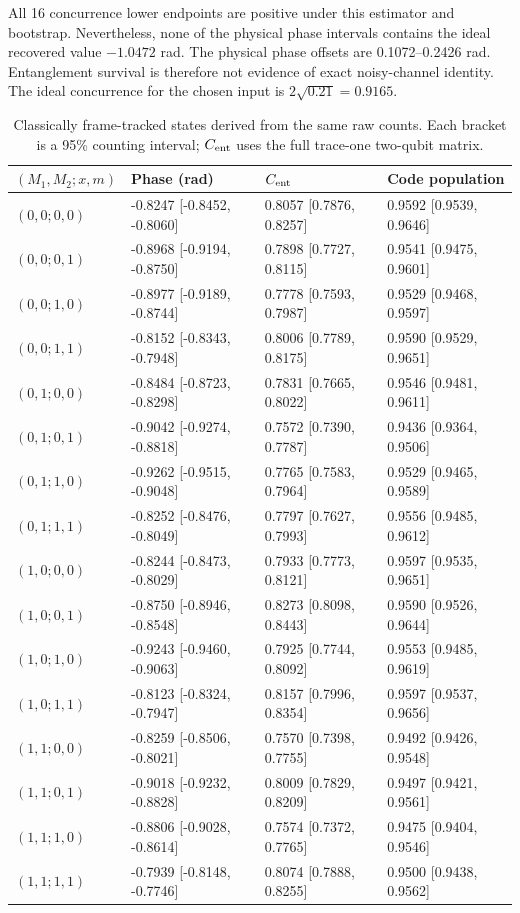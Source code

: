 \documentclass[10pt,a4paper]{article}
\begin{document}
All 16 concurrence lower endpoints are positive under this estimator and bootstrap. Nevertheless, none of the physical phase intervals contains the ideal recovered value $-1.0472$ rad. The physical phase offsets are 0.1072--0.2426 rad. Entanglement survival is therefore not evidence of exact noisy-channel identity. The ideal concurrence for the chosen input is $2\sqrt{0.21}=0.9165$.\clearpage
\par\begin{table}[htbp]\centering\small
\caption{Classically frame-tracked states derived from the same raw counts. Each bracket is a 95\% counting interval; $C_{\rm ent}$ uses the full trace-one two-qubit matrix.}\label{stab:state_frame_tracked}
\begin{tabular}{llll}\toprule
$(M_1,M_2;x,m)$ & Phase (rad) & $C_{\rm ent}$ & Code population\\\midrule
$(0,0;0,0)$ & -0.8247 [-0.8452, -0.8060] & 0.8057 [0.7876, 0.8257] & 0.9592 [0.9539, 0.9646] \\
$(0,0;0,1)$ & -0.8968 [-0.9194, -0.8750] & 0.7898 [0.7727, 0.8115] & 0.9541 [0.9475, 0.9601] \\
$(0,0;1,0)$ & -0.8977 [-0.9189, -0.8744] & 0.7778 [0.7593, 0.7987] & 0.9529 [0.9468, 0.9597] \\
$(0,0;1,1)$ & -0.8152 [-0.8343, -0.7948] & 0.8006 [0.7789, 0.8175] & 0.9590 [0.9529, 0.9651] \\
$(0,1;0,0)$ & -0.8484 [-0.8723, -0.8298] & 0.7831 [0.7665, 0.8022] & 0.9546 [0.9481, 0.9611] \\
$(0,1;0,1)$ & -0.9042 [-0.9274, -0.8818] & 0.7572 [0.7390, 0.7787] & 0.9436 [0.9364, 0.9506] \\
$(0,1;1,0)$ & -0.9262 [-0.9515, -0.9048] & 0.7765 [0.7583, 0.7964] & 0.9529 [0.9465, 0.9589] \\
$(0,1;1,1)$ & -0.8252 [-0.8476, -0.8049] & 0.7797 [0.7627, 0.7993] & 0.9556 [0.9485, 0.9612] \\
$(1,0;0,0)$ & -0.8244 [-0.8473, -0.8029] & 0.7933 [0.7773, 0.8121] & 0.9597 [0.9535, 0.9651] \\
$(1,0;0,1)$ & -0.8750 [-0.8946, -0.8548] & 0.8273 [0.8098, 0.8443] & 0.9590 [0.9526, 0.9644] \\
$(1,0;1,0)$ & -0.9243 [-0.9460, -0.9063] & 0.7925 [0.7744, 0.8092] & 0.9553 [0.9485, 0.9619] \\
$(1,0;1,1)$ & -0.8123 [-0.8324, -0.7947] & 0.8157 [0.7996, 0.8354] & 0.9597 [0.9537, 0.9656] \\
$(1,1;0,0)$ & -0.8259 [-0.8506, -0.8021] & 0.7570 [0.7398, 0.7755] & 0.9492 [0.9426, 0.9548] \\
$(1,1;0,1)$ & -0.9018 [-0.9232, -0.8828] & 0.8009 [0.7829, 0.8209] & 0.9497 [0.9421, 0.9561] \\
$(1,1;1,0)$ & -0.8806 [-0.9028, -0.8614] & 0.7574 [0.7372, 0.7765] & 0.9475 [0.9404, 0.9546] \\
$(1,1;1,1)$ & -0.7939 [-0.8148, -0.7746] & 0.8074 [0.7888, 0.8255] & 0.9500 [0.9438, 0.9562] \\
\bottomrule\end{tabular}\end{table}\par
\end{document}
